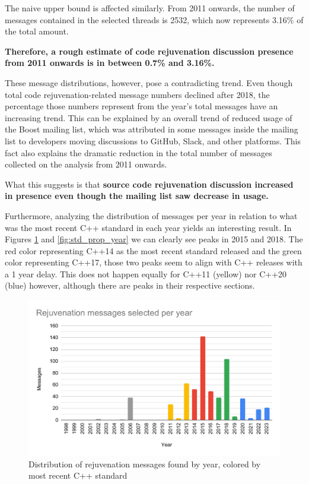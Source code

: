 {\color{red}The naive upper bound is affected similarly. From 2011 onwards, the number of messages contained in the selected threads is 2532, which now represents 3.16\% of the total amount.

\textbf{Therefore, a rough estimate of code rejuvenation discussion presence from 2011 onwards is in between 0.7\% and 3.16\%.}}

These message distributions, however, pose a contradicting trend. Even though total code rejuvenation-related message numbers declined after 2018, the percentage those numbers represent from the year's total messages have an increasing trend. This can be explained by an overall trend of reduced usage of the Boost mailing list, which was attributed in some messages inside the mailing list to developers moving discussions to GitHub, Slack, and other platforms. This fact also explains the dramatic reduction in the total number of messages collected on the analysis from 2011 onwards.

What this suggests is that \textbf{source code rejuvenation discussion increased in presence even though the mailing list saw decrease in usage.}

Furthermore, analyzing the distribution of messages per year in relation to what was the most recent C++ standard in each year yields an interesting result. In Figures \ref{fig:std_msg_year} and \ref{fig:std_prop_year} we can clearly see peaks in 2015 and 2018. The red color representing C++14 as the most recent standard released and the green color representing C++17, those two peaks seem to align with C++ releases with a 1 year delay. This does not happen equally for C++11 (yellow) nor C++20 (blue) however, although there are peaks in their respective sections.

\begin{figure}[h]
  \centering
  \includegraphics[width=\linewidth]{images/rejuv_msg_per_year_std.pdf}
  \caption{Distribution of rejuvenation messages found by year, colored by most recent C++ standard}
  \label{fig:std_msg_year}
\end{figure}

